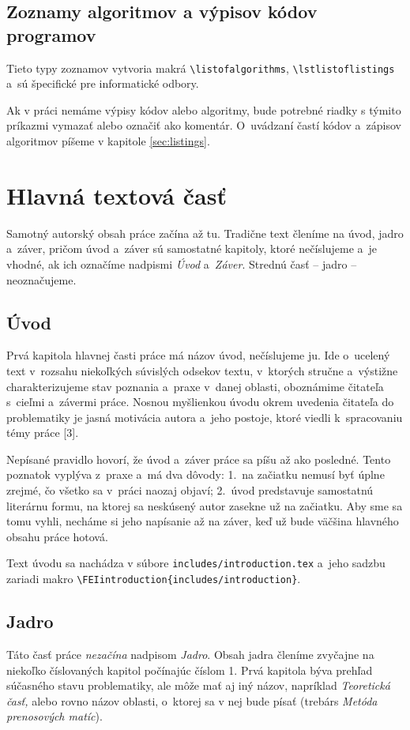 \subsection*{\normalsize Zoznamy algoritmov a výpisov kódov programov}
Tieto typy zoznamov vytvoria makrá \verb|\listofalgorithms|, \verb|\lstlistoflistings| a~sú špecifické pre informatické odbory.

Ak v práci nemáme výpisy kódov alebo algoritmy,
bude potrebné riadky s týmito príkazmi vymazať alebo označiť ako komentár. O~uvádzaní častí kódov
a~zápisov algoritmov píšeme v kapitole \ref{sec:listings}.

\section{Hlavná textová časť}
Samotný autorský obsah práce začína až tu.
Tradične text členíme na úvod, jadro a~záver,
pričom úvod a~záver sú samostatné kapitoly,
ktoré nečíslujeme a~je vhodné,
ak ich označíme nadpismi \emph{Úvod} a~\emph{Záver}.
Strednú časť -- jadro -- neoznačujeme.

\subsection{Úvod}
Prvá kapitola hlavnej časti práce má názov úvod, nečíslujeme ju.
Ide o~ucelený text v~rozsahu niekoľkých súvislých odsekov textu,
v~ktorých stručne a~výstižne charakterizujeme stav poznania
a~praxe v~danej oblasti,
oboznámime čitateľa s~cieľmi a~závermi práce.
Nosnou myšlienkou úvodu okrem uvedenia čitateľa do problematiky
je jasná motivácia autora a~jeho postoje,
ktoré viedli k~spracovaniu témy práce [3].

Nepísané pravidlo hovorí,
že úvod a~záver práce sa píšu až ako posledné.
Tento poznatok vyplýva z~praxe a~má dva dôvody:
1.~na začiatku nemusí byť úplne zrejmé, čo všetko sa v~práci naozaj objaví;
2.~úvod predstavuje samostatnú literárnu formu,
na ktorej sa neskúsený autor zasekne už na začiatku.
Aby sme sa tomu vyhli,
necháme si jeho napísanie až na záver,
keď už bude väčšina hlavného obsahu práce hotová.

Text úvodu sa nachádza v súbore \verb|includes/introduction.tex|
a~jeho sadzbu zariadi makro \verb|\FEIintroduction{includes/introduction}|.

\subsection{Jadro}
Táto časť práce \emph{nezačína} nadpisom \emph{Jadro}.
Obsah jadra členíme zvyčajne na niekoľko číslovaných
kapitol počínajúc číslom 1.
Prvá kapitola býva prehľad súčasného stavu problematiky,
ale môže mať aj iný názov,
napríklad \emph{Teoretická časť,} alebo rovno názov oblasti,
o~ktorej sa v nej bude písať
(trebárs \emph{Metóda prenosových matíc}).

